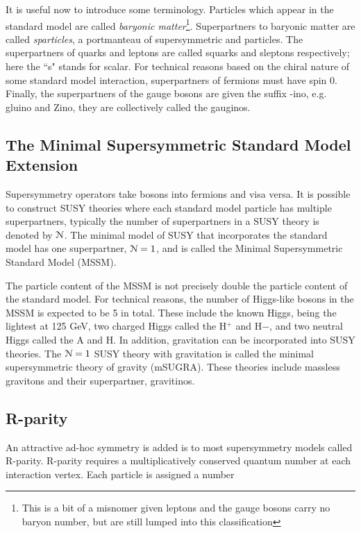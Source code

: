   It is useful now to introduce some terminology. Particles which appear in the standard model are called \emph{baryonic matter}\footnote{This is a bit of a misnomer given leptons and the gauge bosons carry no baryon number, but are still lumped into this classification}. Superpartners to baryonic matter are called \emph{sparticles}, a portmanteau of supersymmetric and particles. The superpartners of quarks and leptons are called squarks and sleptons respectively; here the ``s" stands for scalar. For technical reasons based on the chiral nature of some standard model interaction, superpartners of fermions must have spin 0. Finally, the superpartners of the gauge bosons are given the suffix -ino, e.g. gluino and Zino, they are collectively called the gauginos. 

  \subsection{The Minimal Supersymmetric Standard Model Extension}
    Supersymmetry operators take bosons into fermions and visa versa. It is possible to construct SUSY theories where each standard model particle has multiple superpartners, typically the number of superpartners in a SUSY theory is denoted by $\EuScript{N}$. The minimal model of SUSY that incorporates the standard model has one superpartner, $\EuScript{N} = 1$, and is called the Minimal Supersymmetric Standard Model (MSSM). 

    The particle content of the MSSM is not precisely double the particle content of the standard model. For technical reasons, the number of Higgs-like bosons in the MSSM is expected to be 5 in total. These include the known Higgs, being the lightest at 125 GeV, two charged Higgs called the H$^+$ and H$-$, and two neutral Higgs called the A and H. In addition, gravitation can be incorporated into SUSY theories. The $\EuScript{N} = 1$ SUSY theory with gravitation is called the minimal supersymmetric theory of gravity (mSUGRA). These theories include massless gravitons and their superpartner, gravitinos. 

  \subsection{R-parity} \label{sec:r-parity}

    An attractive ad-hoc symmetry is added is to most supersymmetry models called R-parity. R-parity requires a multiplicatively conserved quantum number at each interaction vertex. Each particle is assigned a number

